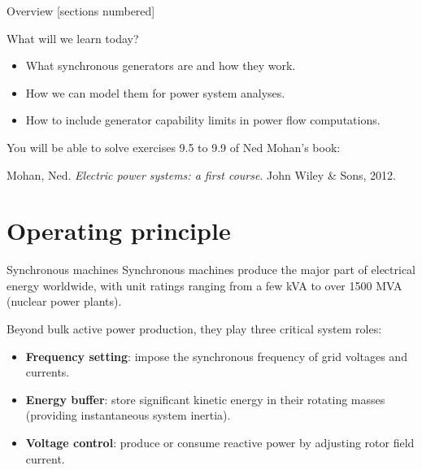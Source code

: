 \titleframe

\begin{frame}{Overview}
  [sections numbered]
  \tableofcontents[hideallsubsections]
\end{frame}

\begin{frame}{What will we learn today?}
  \begin{itemize}
    \item What synchronous generators are and how they work.
    \item How we can model them for power system analyses.
    \item How to include generator capability limits in power flow computations.
  \end{itemize}
  \vspace{0.4cm}
  You will be able to solve exercises 9.5 to 9.9 of Ned Mohan's book:
  \begin{center}
    Mohan, Ned. \textit{Electric power systems: a first course}. John Wiley \& Sons, 2012.
  \end{center}
\end{frame}

\section{Operating principle}

\begin{frame}{Synchronous machines}
  Synchronous machines produce the major part of electrical energy worldwide, with unit ratings ranging from a few kVA to over 1500 MVA (nuclear power plants).
  \vspace{0.15cm}
  
  Beyond bulk active power production, they play three critical system roles:
  \begin{itemize}\setlength{\itemsep}{2pt}
    \item \textbf{Frequency setting}: impose the synchronous frequency of grid voltages and currents.
    \item \textbf{Energy buffer}: store significant kinetic energy in their rotating masses (providing instantaneous system inertia).
    \item \textbf{Voltage control}: produce or consume reactive power by adjusting  rotor field current.
  \end{itemize}
\end{frame}

